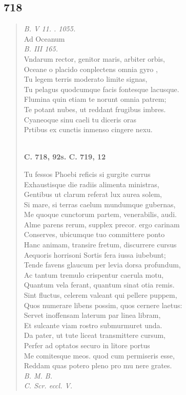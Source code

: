 \documentclass[11pt, a4paper]{report}
\begin{document}
            \subsection*{718}
      \begin{verse}
      \textit{B. V 11. . 1055.} \\ Ad Oceanum \\ \textit{B. III 165.} \\ Vndarum rector, genitor maris, arbiter orbis, \\ Oceane o placido conplectens omnia  \lbrack gyro \rbrack , \\ Tu legem terris moderato limite signas, \\ Tu pelagus quodcumque facis fontesque lacusque. \\ Flumina quin etiam te norunt omnia patrem; \\ Te potant nubes, ut reddant frugibus imbres. \\ Cyaneoque sinu caeli tu diceris oras \\ Prtibus ex cunctis inmenso cingere nexu. \\ 
        ﻿\pagebreak 
    \begin{center} \textbf{C. 718, 92s. C. 719, 12} \end{center} \marginpar{[184]} Tu fessos Phoebi reficis si gurgite currus \\ Exhaustisque die radiis alimenta ministras, \\ Gentibus ut clarum referat lux aurea solem, \\ Si mare, si terras caelum mundumque gubernas, \\ Me quoque cunctorum partem, venerabilis, audi. \\ Alme parens rerum, supplex precor. ergo carinam \\ Conserves, ubicumque tuo committere ponto \\ Hanc animam, transire fretum, discurrere cursus \\ Aequoris horrisoni Sortis fera iussa iubebunt; \\ Tende favens glaucum per levia dorsa profundum, \\ Ac tantum tremulo crispentur caerula motu, \\ Quantum vela ferant, quantum sinat otia remis. \\ Sint fluctus, celerem valeant qui pellere puppem, \\ Quos numerare libens possim, quos cernere laetus: \\ Servet inoffensam laterum par linea libram, \\ Et sulcante viam rostro submurmuret unda. \\ Da pater, ut tute liceat transmittere cursum, \\ Perfer ad optatos securo in litore portus \\ Me comitesque meos. quod cum permiseris esse, \\ Reddam quas potero pleno pro mu \lbrack nere \rbrack  grates. \\ \textit{B. M. B.} \\ \textit{C. Scr. eccl. V.} \\ 
      \end{verse}
  
\end{document}
